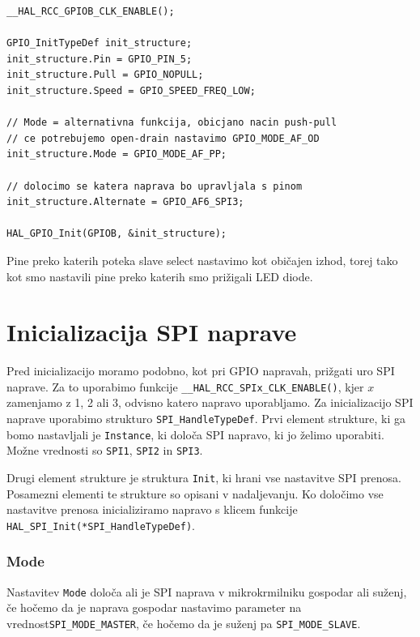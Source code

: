 \documentclass[12pt,letterpaper]{article}
\begin{document}
\begin{center}
\begin{lstlisting}[style=CStyle]
__HAL_RCC_GPIOB_CLK_ENABLE();

GPIO_InitTypeDef init_structure;
init_structure.Pin = GPIO_PIN_5;
init_structure.Pull = GPIO_NOPULL;
init_structure.Speed = GPIO_SPEED_FREQ_LOW;

// Mode = alternativna funkcija, obicjano nacin push-pull
// ce potrebujemo open-drain nastavimo GPIO_MODE_AF_OD
init_structure.Mode = GPIO_MODE_AF_PP;

// dolocimo se katera naprava bo upravljala s pinom
init_structure.Alternate = GPIO_AF6_SPI3;

HAL_GPIO_Init(GPIOB, &init_structure);
\end{lstlisting}
\end{center}

Pine preko katerih poteka slave select nastavimo kot običajen izhod, torej tako kot smo nastavili pine preko katerih smo prižigali LED diode.


\section*{Inicializacija SPI naprave}

Pred inicializacijo moramo podobno, kot pri GPIO napravah, prižgati uro SPI naprave. Za to uporabimo funkcije \texttt{\_\_HAL\_RCC\_SPIx\_CLK\_ENABLE()}, kjer $x$ zamenjamo z 1, 2 ali 3, odvisno katero napravo uporabljamo. Za inicializacijo SPI naprave uporabimo strukturo \texttt{SPI\_HandleTypeDef}. Prvi element strukture, ki ga bomo nastavljali je \texttt{Instance}, ki določa SPI napravo, ki jo želimo uporabiti. Možne vrednosti so \texttt{SPI1}, \texttt{SPI2} in \texttt{SPI3}.

Drugi element strukture je struktura \texttt{Init}, ki hrani vse nastavitve SPI prenosa. Posamezni elementi te strukture so opisani v nadaljevanju. Ko določimo vse nastavitve prenosa inicializiramo napravo s klicem funkcije \texttt{HAL\_SPI\_Init(*SPI\_HandleTypeDef)}.

\subsubsection*{Mode}

Nastavitev \texttt{Mode} določa ali je SPI naprava v mikrokrmilniku gospodar ali suženj, če hočemo da je naprava gospodar nastavimo parameter na vrednost\texttt{SPI\_MODE\_MASTER}, če hočemo da je suženj pa \texttt{SPI\_MODE\_SLAVE}.
\end{document}
